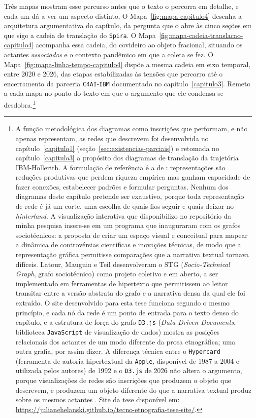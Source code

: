 Três mapas mostram esse percurso antes que o texto o percorra em detalhe, e cada um dá a ver um aspecto distinto. O Mapa~\ref{fig:mapa-capitulo4} desenha a arquitetura argumentativa do capítulo, da pergunta que o abre às cinco seções em que sigo a cadeia de translação do \texttt{Spira}. O Mapa~\ref{fig:mapa-cadeia-translacao-capitulo4} acompanha essa cadeia, do covideiro ao objeto fracional, situando os actantes \textit{associados} e o contexto pandêmico em que a coleta se fez. O Mapa~\ref{fig:mapa-linha-tempo-capitulo4} dispõe a mesma cadeia em eixo temporal, entre 2020 e 2026, das etapas estabilizadas às tensões que percorro até o encerramento da parceria \texttt{C4AI}-\texttt{IBM} documentado no capítulo~\ref{capitulo3}. Remeto a cada mapa no ponto do texto em que o argumento que ele condensa se desdobra.\footnote{A função metodológica dos diagramas como inscrições que performam, e não apenas representam, as redes que descrevem foi desenvolvida no capítulo~\ref{capitulo1} (seção~\ref{sec:existencias-parciais}) e retomada no capítulo~\ref{capitulo3} a propósito dos diagramas de translação da trajetória IBM-Hollerith. A formulação de referência é a de \textcite{Law2004After}: representações são reduções produtivas que perdem riqueza empírica mas ganham capacidade de fazer conexões, estabelecer padrões e formular perguntas. Nenhum dos diagramas deste capítulo pretende ser exaustivo, porque toda representação de rede é já um corte, uma escolha de quais fios seguir e quais deixar no \textit{hinterland}. A visualização interativa que disponibilizo no repositório da minha pesquisa insere-se em um programa que \textcite{LatourMauguinTeil1992} inauguraram com os grafos sociotécnicos: a proposta de criar um espaço visual e conceitual para mapear a dinâmica de controvérsias científicas e inovações técnicas, de modo que a representação gráfica permitisse comparações que a narrativa textual tornava difíceis. Latour, Mauguin e Teil desenvolveram o STG (\textit{Socio-Technical Graph}, grafo sociotécnico) como projeto coletivo e em aberto, a ser implementado em ferramentas de hipertexto que permitissem ao leitor transitar entre a versão abstrata do grafo e a narrativa densa da qual ele foi extraído. O site desenvolvido para esta tese funciona segundo o mesmo princípio, e cada nó da rede é um ponto de entrada para o texto denso do capítulo, e a estrutura de força do grafo \texttt{D3.js} (\textit{Data-Driven Documents}, biblioteca \texttt{JavaScript} de visualização de dados) mostra as posições relacionais dos actantes de um modo diferente da prosa etnográfica; uma outra grafia, por assim dizer. A diferença técnica entre o \texttt{Hypercard} (ferramenta de autoria hipertextual da \texttt{Apple}, disponível de 1987 a 2004 e utilizada pelos autores) de 1992 e o \texttt{D3.js} de 2026 não altera o argumento, porque visualizações de redes são inscrições que produzem o objeto que descrevem, e produzem um objeto diferente do que a narrativa textual produz sobre os mesmos actantes \parencite{LatourMauguinTeil1992}. Site da tese disponível em: \url{https://julianehelanski.github.io/tecno-etnografia-tese-site/}.}

